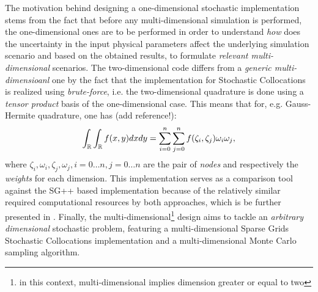	The motivation behind designing a one-dimensional stochastic implementation stems from the fact that before any multi-dimensional simulation is performed, the one-dimensional ones are to be performed in order to understand \emph{how} does the uncertainty in the input physical parameters affect the underlying simulation scenario and based on the obtained results, to formulate \emph{relevant multi-dimensional} scenarios. The two-dimensional code differs from a \emph{generic multi-dimensioanl} one by the fact that the implementation for Stochastic Collocations is realized using \emph{brute-force}, i.e. the two-dimensional quadrature is done using a \emph{tensor product} basis of the one-dimensional case. This means that for, e.g. Gauss-Hermite quadrature, one has (add reference!):
\begin{equation} \label{eq:2dimquad}
\int_{\mathbb{R}}{\int_{\mathbb{R}}{f(x,y)dxdy}} = \sum_{i=0}^n{\sum_{j=0}^n{f(\zeta_i, \zeta_j)\omega_i \omega_j}},
\end{equation}
where $\zeta_i, \omega_i, \zeta_j, \omega_j, i=0\ldots n, j=0\ldots n$ are the pair of \emph{nodes} and respectively the \emph{weights} for each dimension. This implementation serves as a comparison tool against the SG++ based implementation because of the relatively similar required computational resources by both approaches, which is be further presented in . Finally, the multi-dimensional\footnote{in this context, multi-dimensional implies dimension greater or equal to two} design aims to tackle an \emph{arbitrary dimensional} stochastic problem, featuring a multi-dimensional Sparse Grids Stochastic Collocations implementation and a multi-dimensional Monte Carlo sampling algorithm. 

